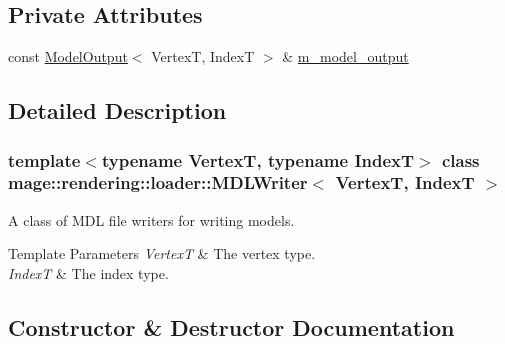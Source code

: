 \subsection*{Private Attributes}
\begin{DoxyCompactItemize}
\item 
const \mbox{\hyperlink{structmage_1_1rendering_1_1_model_output}{Model\+Output}}$<$ VertexT, IndexT $>$ \& \mbox{\hyperlink{classmage_1_1rendering_1_1loader_1_1_m_d_l_writer_aefa6dfd7c4d7e2abe92e9c93b1e8638c}{m\+\_\+model\+\_\+output}}
\end{DoxyCompactItemize}


\subsection{Detailed Description}
\subsubsection*{template$<$typename VertexT, typename IndexT$>$\newline
class mage\+::rendering\+::loader\+::\+M\+D\+L\+Writer$<$ Vertex\+T, Index\+T $>$}

A class of M\+DL file writers for writing models.


\begin{DoxyTemplParams}{Template Parameters}
{\em VertexT} & The vertex type. \\
\hline
{\em IndexT} & The index type. \\
\hline
\end{DoxyTemplParams}


\subsection{Constructor \& Destructor Documentation}
\mbox{\label{classmage_1_1rendering_1_1loader_1_1_m_d_l_writer_a6b30e49f08b5c6cd4702f5fdecd17561}} 
